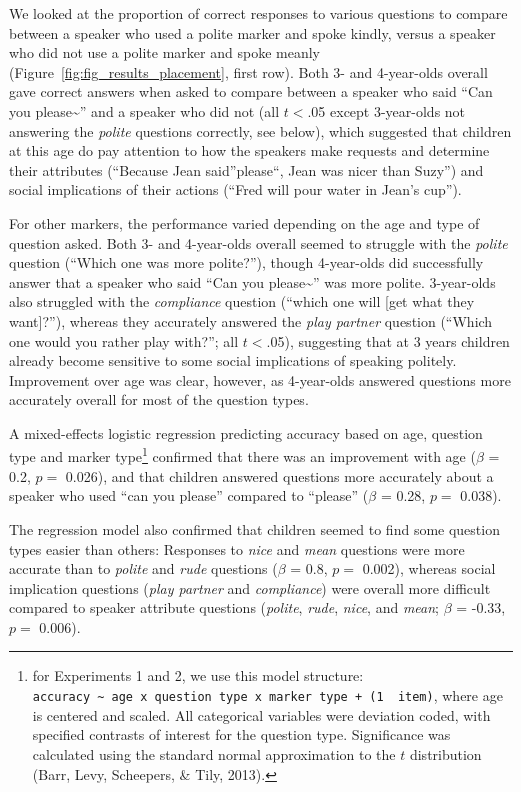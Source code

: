 \documentclass[10pt, letterpaper]{article}
\begin{document}
We looked at the proportion of correct responses to various questions to
compare between a speaker who used a polite marker and spoke kindly,
versus a speaker who did not use a polite marker and spoke meanly
(Figure~\ref{fig:fig_results_placement}, first row). Both 3- and
4-year-olds overall gave correct answers when asked to compare between a
speaker who said ``Can you please\textasciitilde{}'' and a speaker who
did not (all \(t<\).05 except 3-year-olds not answering the
\emph{polite} questions correctly, see below), which suggested that
children at this age do pay attention to how the speakers make requests
and determine their attributes (``Because Jean said''please``, Jean was
nicer than Suzy'') and social implications of their actions (``Fred will
pour water in Jean's cup'').

For other markers, the performance varied depending on the age and type
of question asked. Both 3- and 4-year-olds overall seemed to struggle
with the \emph{polite} question (``Which one was more polite?''), though
4-year-olds did successfully answer that a speaker who said ``Can you
please\textasciitilde{}'' was more polite. 3-year-olds also struggled
with the \emph{compliance} question (``which one will {[}get what they
want{]}?''), whereas they accurately answered the \emph{play partner}
question (``Which one would you rather play with?''; all \(t<\).05),
suggesting that at 3 years children already become sensitive to some
social implications of speaking politely. Improvement over age was
clear, however, as 4-year-olds answered questions more accurately
overall for most of the question types.

A mixed-effects logistic regression predicting accuracy based on age,
question type and marker type\footnote{for Experiments 1 and 2, we use
  this model structure:
  \texttt{accuracy\ \textasciitilde{}\ age\ x\ question\ type\ x\ marker\ type\ +\ (1\ \textbar{}\ item)},
  where age is centered and scaled. All categorical variables were
  deviation coded, with specified contrasts of interest for the question
  type. Significance was calculated using the standard normal
  approximation to the \(t\) distribution (Barr, Levy, Scheepers, \&
  Tily, 2013).} confirmed that there was an improvement with age
(\(\beta\) = 0.2, \(p =\) 0.026), and that children answered questions
more accurately about a speaker who used ``can you please'' compared to
``please'' (\(\beta\) = 0.28, \(p =\) 0.038).

The regression model also confirmed that children seemed to find some
question types easier than others: Responses to \emph{nice} and
\emph{mean} questions were more accurate than to \emph{polite} and
\emph{rude} questions (\(\beta\) = 0.8, \(p =\) 0.002), whereas social
implication questions (\emph{play partner} and \emph{compliance}) were
overall more difficult compared to speaker attribute questions
(\emph{polite}, \emph{rude}, \emph{nice}, and \emph{mean}; \(\beta\) =
-0.33, \(p =\) 0.006).
\end{document}

